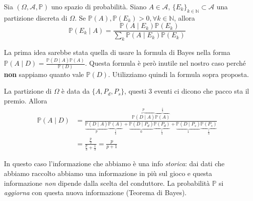 \begin{enumerate}
\begin{theorem}
Sia $( \Omega ,\mathcal{A} ,\mathbb{P})$ uno spazio di probabilità. Siano $A\in \mathcal{A}$, $\{E_{k}\}_{k\in \mathbb{N}} \subset \mathcal{A}$ una partizione discreta di $\Omega $. Se $\mathbb{P}( A) ,\mathbb{P}( E_{k})  >0,\forall k\in \mathbb{N}$, allora
\begin{equation*}
\mathbb{P}( E_{k} \mid A) =\frac{\mathbb{P}( A\mid E_{k})\mathbb{P}( E_{k})}{\sum_{k}\mathbb{P}( A\mid E_{k})\mathbb{P}( E_{k})}
\end{equation*}
\end{theorem}

\begin{oss}
La prima idea sarebbe stata quella di usare la formula di Bayes nella forma $\mathbb{P}( A\mid D) =\frac{\mathbb{P}( D\mid A)\mathbb{P}( A)}{\mathbb{P}( D)}$. Questa formula è però inutile nel nostro caso perché \textbf{non} sappiamo quanto vale $\mathbb{P}( D)$. Utilizziamo quindi la formula sopra proposta.
\end{oss}

La partizione di $\Omega $ è data da $\{A,P_{d} ,P_{s}\}$, questi $3$ eventi ci dicono che pacco sta il premio. Allora\begin{equation*}
\begin{aligned}
\mathbb{P}( A\mid D) & =\frac{\overbrace{\mathbb{P}( D\mid A)}^{p}\overbrace{\mathbb{P}( A)}^{\frac{1}{3}}}{\underbrace{\mathbb{P}( D\mid A)}_{p}\underbrace{\mathbb{P}( A)}_{\frac{1}{3}} +\underbrace{\mathbb{P}( D\mid P_{d})}_{0}\underbrace{\mathbb{P}( P_{d})}_{\frac{1}{3}} +\underbrace{\mathbb{P}( D\mid P_{s})}_{1}\underbrace{\mathbb{P}( P_{s})}_{\frac{1}{3}}}\\
 & =\frac{\frac{p}{3}}{\frac{p}{3} +\frac{1}{3}} =\frac{p}{p+1}
\end{aligned}
\end{equation*}

\begin{oss}
In questo caso l'informazione che abbiamo è una info \textit{storica}: dai dati che abbiamo raccolto abbiamo una informazione in più sul gioco e questa informazione \textit{non} dipende dalla scelta del conduttore. La probabilità $\mathbb{P}$ si \textit{aggiorna} con questa nuova informazione (Teorema di Bayes).
\end{oss}


\end{enumerate}
